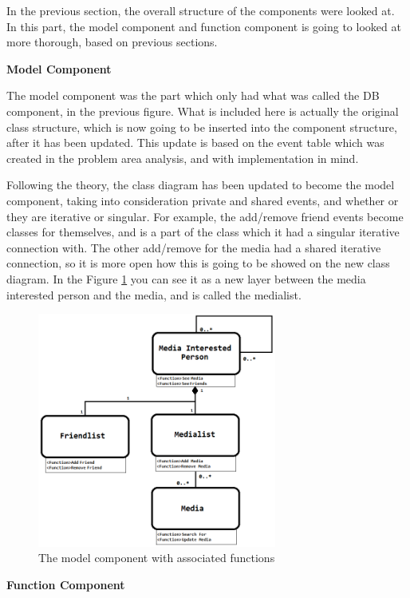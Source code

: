 In the previous section, the overall structure of the components were looked at. In this part, the model component and function component is going to looked at more thorough, based on previous sections.

\textbf{Model Component}

The model component was the part which only had what was called the DB component, in the previous figure. What is included here is actually the original class structure, which is now going to be inserted into the component structure, after it has been updated. This update is based on the event table which was created in the problem area analysis, and with implementation in mind.

Following the theory, the class diagram has been updated to become the model component, taking into consideration private and shared events, and whether or they are iterative or singular. For example, the add/remove friend events become classes for themselves, and is a part of the class which it had a singular iterative connection with. The other add/remove for the media had a shared iterative connection, so it is more open how this is going to be showed on the new class diagram. In the Figure \ref{ModelComponent} you can see it as a new layer between the media interested person and the media, and is called the medialist.

\begin{figure}[htb]
\centering
\includegraphics[width=0.7\textwidth]{Images/modelcomponent.png}
\caption{The model component with associated functions}
\label{ModelComponent}
\end{figure}

\textbf{Function Component}

